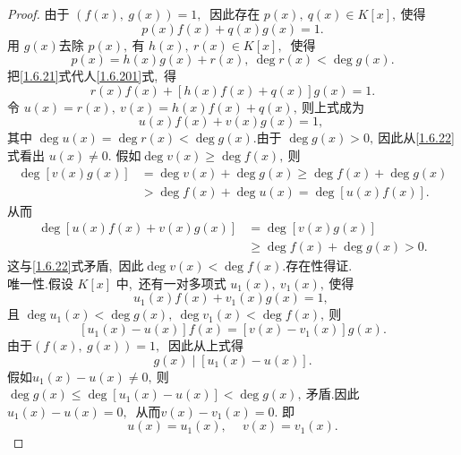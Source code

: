 \begin{proof}
	由于 $ (f(x),\  g(x))=1 ,\ $ 因此存在 $ p(x),\  q(x) \in K[x] ,\  $使得
	\begin{equation}
		p(x) f(x)+q(x) g(x)=1 .\label{1.6.201}
	\end{equation}
	用  $g(x)  $去除  $p(x) ,\  $有  $h(x),\  r(x) \in K[x] ,\ $ 使得
	\begin{equation}
		p(x)=h(x) g(x)+r(x),\  \operatorname{deg} r(x)<\operatorname{deg} g(x) .\label{1.6.21}
	\end{equation}
	把\eqref{1.6.21}式代人\eqref{1.6.201}式,\  得
	$$r(x) f(x)+[h(x) f(x)+q(x)] g(x)=1 .$$
	令  $u(x)=r(x),\  v(x)=h(x) f(x)+q(x) ,\  $则上式成为
	\begin{equation}
		u(x) f(x)+v(x) g(x)=1,\ \label{1.6.22}
	\end{equation}
	其中 $ \operatorname{deg} u(x)=\operatorname{deg} r(x)<\operatorname{deg} g(x)  .$由于 $ \operatorname{deg} g(x)>0 ,\  $因此从\eqref{1.6.22}式看出 $ u(x) \neq 0  .$
	假如$  \operatorname{deg} v(x) \geqslant \operatorname{deg} f(x) ,\  $则
	$$\begin{aligned}
		\operatorname{deg}[v(x) g(x)] & =\operatorname{deg} v(x)+\operatorname{deg} g(x) \geqslant \operatorname{deg} f(x)+\operatorname{deg} g(x) \\
		& >\operatorname{deg} f(x)+\operatorname{deg} u(x)=\operatorname{deg}[u(x) f(x)] .
	\end{aligned}$$
	从而
	$$\begin{aligned}
		\operatorname{deg}[u(x) f(x)+v(x) g(x)] & =\operatorname{deg}[v(x) g(x)] \\
		& \geqslant \operatorname{deg} f(x)+\operatorname{deg} g(x)>0 .
	\end{aligned}$$
	这与\eqref{1.6.22}式矛盾,\  因此$  \operatorname{deg} v(x)<\operatorname{deg} f(x)  .$存在性得证.\\
	唯一性.假设 $ K[x] $ 中,\  还有一对多项式  $u_{1}(x),\  v_{1}(x) ,\  $使得
	$$u_{1}(x) f(x)+v_{1}(x) g(x)=1,\ $$
	且  $\operatorname{deg} u_{1}(x)<\operatorname{deg} g(x),\  \operatorname{deg} v_{1}(x)<\operatorname{deg} f(x) ,\  $则
	$$\left[u_{1}(x)-u(x)\right] f(x)=\left[v(x)-v_{1}(x)\right] g(x) .$$
	由于$  (f(x),\  g(x))=1 ,\ $ 因此从上式得
	$$g(x) \mid\left[u_{1}(x)-u(x)\right] .$$
	假如$  u_{1}(x)-u(x) \neq 0 ,\  $则  $\operatorname{deg} g(x) \leqslant \operatorname{deg}\left[u_{1}(x)-u(x)\right]<\operatorname{deg} g(x) ,\  $矛盾.因此 $ u_{1}(x)-u(x)=0 ,\ $ 从而$  v(x)-v_{1}(x)=0  .$ 即
	$$u(x)=u_{1}(x),\  \quad v(x)=v_{1}(x) .$$
\end{proof}
